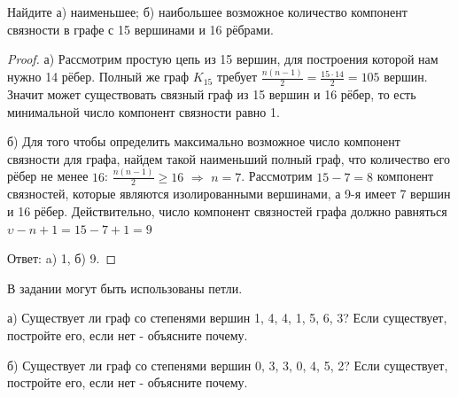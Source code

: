 
\renewcommand*{\proofname}{Решение}

\begin{problem}[2]
	Найдите а) наименьшее; б) наибольшее возможное количество компонент связности в графе с 15 вершинами и 16 рёбрами.
\end{problem}

\begin{proof}
    а) Рассмотрим простую цепь из 15 вершин, для построения которой нам нужно 14 рёбер. Полный же граф \(K_{15}\) требует \(\frac{n(n - 1)}{2} = \frac{15\cdot{14}}{2} = 105\) вершин. Значит может существовать связный граф из 15 вершин и 16 рёбер, то есть минимальной число компонент связности равно 1.

    б) Для того чтобы определить максимально возможное число компонент связности для графа, найдем такой наименьший полный граф, что количество его рёбер не менее $16$: $\frac{n(n - 1)}{2} \geqslant 16$ $\Rightarrow$ $n = 7$. Рассмотрим $15 - 7 = 8$ компонент связностей, которые являются изолированными вершинами, а 9-я имеет 7 вершин и 16 рёбер. Действительно, число компонент связностей графа должно равняться $\upsilon - n + 1 = 15 - 7 + 1 = 9$

    Ответ: a) 1, б) 9.
\end{proof}

\begin{problem}[3]
	В задании могут быть использованы петли.
    
    а) Существует ли граф со степенями вершин 1, 4, 4, 1, 5, 6, 3? Если существует, постройте его, если нет - объясните почему.
    
    б) Существует ли граф со степенями вершин 0, 3, 3, 0, 4, 5, 2? Если существует, постройте его, если нет - объясните почему.
\end{problem}

